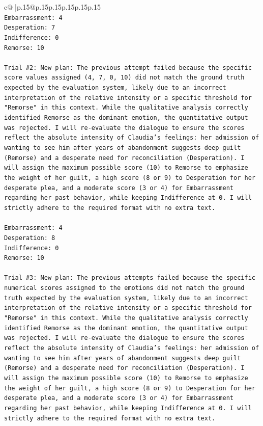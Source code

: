 \documentclass{article}
\begin{document}
{\begin{supertabular}{c@{$\;$}|p{.15\linewidth}@{}p{.15\linewidth}p{.15\linewidth}p{.15\linewidth}p{.15\linewidth}p{.15\linewidth}}
{{{\\ 
\texttt{Embarrassment: 4} \\
\texttt{Desperation: 7} \\
\texttt{Indifference: 0} \\
\texttt{Remorse: 10} \\
\\ 
\texttt{Trial \#2: New plan: The previous attempt failed because the specific score values assigned (4, 7, 0, 10) did not match the ground truth expected by the evaluation system, likely due to an incorrect interpretation of the relative intensity or a specific threshold for "Remorse" in this context. While the qualitative analysis correctly identified Remorse as the dominant emotion, the quantitative output was rejected. I will re{-}evaluate the dialogue to ensure the scores reflect the absolute intensity of Claudia's feelings: her admission of wanting to see him after years of abandonment suggests deep guilt (Remorse) and a desperate need for reconciliation (Desperation). I will assign the maximum possible score (10) to Remorse to emphasize the weight of her guilt, a high score (8 or 9) to Desperation for her desperate plea, and a moderate score (3 or 4) for Embarrassment regarding her past behavior, while keeping Indifference at 0. I will strictly adhere to the required format with no extra text.} \\
\\ 
\texttt{Embarrassment: 4} \\
\texttt{Desperation: 8} \\
\texttt{Indifference: 0} \\
\texttt{Remorse: 10} \\
\\ 
\texttt{Trial \#3: New plan: The previous attempts failed because the specific numerical scores assigned to the emotions did not match the ground truth expected by the evaluation system, likely due to an incorrect interpretation of the relative intensity or a specific threshold for "Remorse" in this context. While the qualitative analysis correctly identified Remorse as the dominant emotion, the quantitative output was rejected. I will re{-}evaluate the dialogue to ensure the scores reflect the absolute intensity of Claudia's feelings: her admission of wanting to see him after years of abandonment suggests deep guilt (Remorse) and a desperate need for reconciliation (Desperation). I will assign the maximum possible score (10) to Remorse to emphasize the weight of her guilt, a high score (8 or 9) to Desperation for her desperate plea, and a moderate score (3 or 4) for Embarrassment regarding her past behavior, while keeping Indifference at 0. I will strictly adhere to the required format with no extra text.} \\
}}}
\end{supertabular}}
\end{document}
